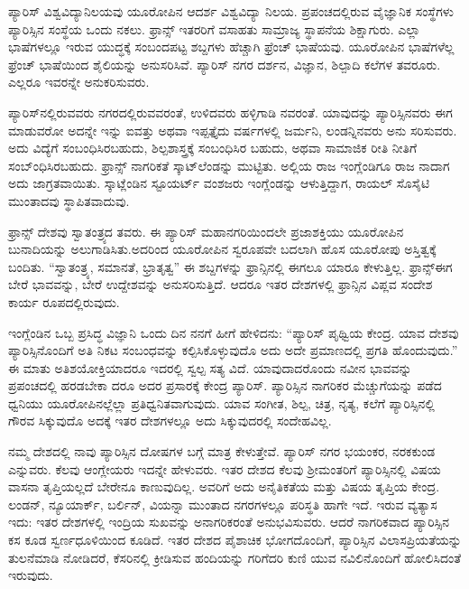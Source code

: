 ಪ್ಯಾರಿಸ್​ ವಿಶ್ವವಿದ್ಯಾನಿಲಯವು ಯೂರೋಪಿನ ಆದರ್ಶ ವಿಶ್ವವಿದ್ಯಾ ನಿಲಯ. ಪ್ರಪಂಚದಲ್ಲಿರುವ ವೈಜ್ಞಾನಿಕ ಸಂಸ್ಥೆಗಳು ಪ್ಯಾರಿಸ್ಸಿನ ಸಂಸ್ಥೆಯ ಒಂದು ನಕಲು. ಫ್ರಾನ್ಸ್​ ಇತರರಿಗೆ ವಸಾಹತು ಸಾಮ್ರಾಜ್ಯ ಸ್ಥಾಪನೆಯ ಶಿಕ್ಷಾಗುರು. ಎಲ್ಲಾ ಭಾಷೆಗಳಲ್ಲೂ ಇರುವ ಯುದ್ಧಕ್ಕೆ ಸಂಬಂದಪಟ್ಟ ಶಬ್ದಗಳು ಹೆಚ್ಚಾಗಿ ಫ್ರೆಂಚ್​ ಭಾಷೆಯವು. ಯೂರೋಪಿನ ಭಾಷೆಗಳೆಲ್ಲ ಫ್ರೆಂಚ್​ ಭಾಷೆಯಿಂದ ಶೈಲಿಯನ್ನು ಅನುಸರಿಸಿವೆ. ಪ್ಯಾರಿಸ್​ ನಗರ ದರ್ಶನ, ವಿಜ್ಞಾನ, ಶಿಲ್ಪಾದಿ ಕಲೆಗಳ ತವರೂರು. ಎಲ್ಲರೂ ಇವರನ್ನೇ ಅನುಕರಿಸುವರು.

ಪ್ಯಾರಿಸ್​ನಲ್ಲಿರುವವರು ನಗರದಲ್ಲಿರುವವರಂತೆ, ಉಳಿದವರು ಹಳ್ಳಿಗಾಡಿ ನವರಂತೆ. ಯಾವುದನ್ನು ಪ್ಯಾರಿಸ್ಸಿನವರು ಈಗ ಮಾಡುವರೋ ಅದನ್ನೇ ಇನ್ನು ಐವತ್ತು ಅಥವಾ ಇಪ್ಪತ್ತೈದು ವರ್ಷಗಳಲ್ಲಿ ಜರ್ಮನಿ, ಲಂಡನ್ನಿನವರು ಅನು ಸರಿಸುವರು. ಅದು ವಿದ್ಯೆಗೆ ಸಂಬಂಧಿಸಿರಬಹುದು, ಶಿಲ್ಪಶಾಸ್ತ್ರಕ್ಕೆ ಸಂಬಂಧಿಸಿರ ಬಹುದು, ಅಥವಾ ಸಾಮಾಜಿಕ ರೀತಿ ನೀತಿಗೆ ಸಂಬ್ಂಧಿಸಿರಬಹುದು. ಫ್ರಾನ್ಸ್​ ನಾಗರಿಕತೆ ಸ್ಕಾಟ್​ಲೆಂಡನ್ನು ಮುಟ್ಟಿತು. ಅಲ್ಲಿಯ ರಾಜ ಇಂಗ್ಲೆಂಡಿಗೂ ರಾಜ ನಾದಾಗ ಅದು ಜಾಗ್ರತವಾಯಿತು. ಸ್ಕಾಟ್ಲೆಂಡಿನ ಸ್ಟೂಯರ್ಟ್ ವಂಶಜರು ಇಂಗ್ಲೆಂಡನ್ನು ಆಳುತ್ತಿದ್ದಾಗ, ರಾಯಲ್​ ಸೊಸೈಟಿ ಮುಂತಾದವು ಸ್ಥಾಪಿತವಾದುವು.

ಫ್ರಾನ್ಸ್​ ದೇಶವು ಸ್ವಾತಂತ್ರ್ಯದ ತವರು. ಈ ಪ್ಯಾರಿಸ್​ ಮಹಾನಗರಿಯಿಂದಲೇ ಪ್ರಜಾಶಕ್ತಿಯು ಯೂರೋಪಿನ ಬುನಾದಿಯನ್ನು ಅಲುಗಾಡಿಸಿತು.ಅದರಿಂದ ಯೂರೋಪಿನ ಸ್ವರೂಪವೇ ಬದಲಾಗಿ ಹೊಸ ಯೂರೋಪು ಅಸ್ತಿತ್ವಕ್ಕೆ ಬಂದಿತು. “ಸ್ವಾತಂತ್ರ್ಯ, ಸಮಾನತೆ, ಭ್ರಾತೃತ್ವ” ಈ ಶಬ್ದಗಳನ್ನು ಫ್ರಾನ್ಸಿನಲ್ಲಿ ಈಗಲೂ ಯಾರೂ ಕೇಳುತ್ತಿಲ್ಲ. ಫ್ರಾನ್ಸ್​ ಈಗ ಬೇರೆ ಭಾವವನ್ನು, ಬೇರೆ ಉದ್ದೇಶವನ್ನು ಅನುಸರಿಸುತ್ತಿದೆ. ಆದರೂ ಇತರ ದೇಶಗಳಲ್ಲಿ ಫ್ರಾನ್ಸಿನ ವಿಪ್ಲವ ಸಂದೇಶ ಕಾರ್ಯ ರೂಪದಲ್ಲಿರುವುದು.

ಇಂಗ್ಲೆಂಡಿನ ಒಬ್ಬ ಪ್ರಸಿದ್ಧ ವಿಜ್ಞಾನಿ ಒಂದು ದಿನ ನನಗೆ ಹೀಗೆ ಹೇಳಿದನು: “ಪ್ಯಾರಿಸ್​ ಪೃಥ್ವಿಯ ಕೇಂದ್ರ. ಯಾವ ದೇಶವು ಪ್ಯಾರಿಸ್ಸಿನೊಂದಿಗೆ ಅತಿ ನಿಕಟ ಸಂಬಂಧವನ್ನು ಕಲ್ಪಿಸಿಕೊಳ್ಳುವುದೊ ಅದು ಅದೇ ಪ್ರಮಾಣದಲ್ಲಿ ಪ್ರಗತಿ ಹೊಂದುವುದು.” ಈ ಮಾತು ಅತಿಶಯೋಕ್ತಿಯಾದರೂ ಇದರಲ್ಲಿ ಸ್ವಲ್ಪ ಸತ್ಯ ವಿದೆ. ಯಾವುದಾದರೊಂದು ನವೀನ ಭಾವವನ್ನು ಪ್ರಪಂಚದಲ್ಲಿ ಹರಡಬೇಕಾ ದರೂ ಅದರ ಪ್ರಸಾರಕ್ಕೆ ಕೇಂದ್ರ ಪ್ಯಾರಿಸ್​. ಪ್ಯಾರಿಸ್ಸಿನ ನಾಗರಿಕರ ಮೆಚ್ಚುಗೆಯನ್ನು ಪಡೆದ ಧ್ವನಿಯು ಯೂರೋಪಿನಲ್ಲೆಲ್ಲಾ ಪ್ರತಿಧ್ವನಿತವಾಗುವುದು. ಯಾವ ಸಂಗೀತ, ಶಿಲ್ಪ, ಚಿತ್ರ, ನೃತ್ಯ, ಕಲೆಗೆ ಪ್ಯಾರಿಸ್ಸಿನಲ್ಲಿ ಗೌರವ ಸಿಕ್ಕುವುದೊ ಅದಕ್ಕೆ ಇತರ ದೇಶಗಳಲ್ಲೂ ಅದು ಸಿಕ್ಕುವುದರಲ್ಲಿ ಸಂದೇಹವಿಲ್ಲ.

ನಮ್ಮ ದೇಶದಲ್ಲಿ ನಾವು ಪ್ಯಾರಿಸ್ಸಿನ ದೋಷಗಳ ಬಗ್ಗೆ ಮಾತ್ರ ಕೇಳುತ್ತೇವೆ. ಪ್ಯಾರಿಸ್​ ನಗರ ಭಯಂಕರ, ನರಕಕುಂಡ ಎನ್ನುವರು. ಕೆಲವು ಆಂಗ್ಲೇಯರು ಇದನ್ನೇ ಹೇಳುವರು. ಇತರ ದೇಶದ ಕೆಲವು ಶ‍್ರೀಮಂತರಿಗೆ ಪ್ಯಾರಿಸ್ಸಿನಲ್ಲಿ ವಿಷಯ ವಾಸನಾ ತೃಪ್ತಿಯಲ್ಲದೆ ಬೇರೇನೂ ಕಾಣುವುದಿಲ್ಲ. ಅವರಿಗೆ ಅದು ಅನೈತಿಕತೆಯ ಮತ್ತು ವಿಷಯ ತೃಪ್ತಿಯ ಕೇಂದ್ರ. ಲಂಡನ್​, ನ್ಯೂಯಾರ್ಕ್​, ಬರ್ಲಿನ್​, ವಿಯನ್ನಾ ಮುಂತಾದ ನಗರಗಳಲ್ಲೂ ಪರಿಸ್ಥತಿ ಹಾಗೇ ಇದೆ. ಇರುವ ವ್ಯತ್ಯಾಸ ಇದು: ಇತರ ದೇಶಗಳಲ್ಲಿ ಇಂದ್ರಿಯ ಸುಖವನ್ನು ಅನಾಗರಿಕರಂತೆ ಅನುಭವಿಸುವರು. ಆದರೆ ನಾಗರಿಕವಾದ ಪ್ಯಾರಿಸ್ಸಿನ ಕಸ ಕೂಡ ಸ್ವರ್ಣಧೂಳಿಯಿಂದ ಕೂಡಿದೆ. ಇತರ ದೇಶದ ಪೈಶಾಚಿಕ ಭೋಗದೊಂದಿಗೆ, ಪ್ಯಾರಿಸ್ಸಿನ ವಿಲಾಸಪ್ರಿಯತೆಯನ್ನು ತುಲನೆಮಾಡಿ ನೋಡಿದರೆ, ಕೆಸರಿನಲ್ಲಿ ಕ್ರೀಡಿಸುವ ಹಂದಿಯನ್ನು ಗರಿಗೆದರಿ ಕುಣಿ ಯುವ ನವಿಲಿನೊಂದಿಗೆ ಹೋಲಿಸಿದಂತೆ ಇರುವುದು.

